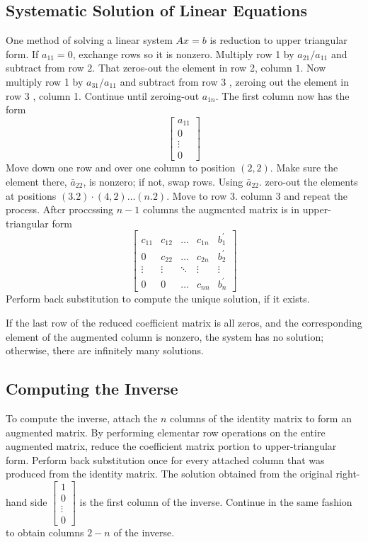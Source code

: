 \documentclass[../main.tex]{subfiles}
\begin{document}
\subsection*{Systematic Solution of Linear Equations}
One method of solving a linear system $A x=b$ is reduction to upper triangular form. If $a_{11}=0$, exchange rows so it is nonzero. Multiply row 1 by $a_{21} / a_{11}$ and subtract from row $2 .$ That zeros-out the element in row 2, column $1 .$ Now multiply row 1 by $a_{31} / a_{11}$ and subtract from row 3 , zeroing out the element in row 3 , column 1. Continue until zeroing-out $a_{1 n}$. The first column now has the form
$$
\left[\begin{array}{c}
a_{11} \\
0 \\
\vdots \\
0
\end{array}\right]
$$
Move down one row and over one column to position $(2,2) .$ Make sure the element there, $\bar{a}_{22}$, is nonzero; if not, swap rows. Using $\bar{a}_{22}$. zero-out the elements at positions $(3.2) \cdot(4,2) \ldots(n .2)$. Move to row 3. column 3 and repeat the process. Aftcr proccssing $n-1$ columns the augmcntcd matrix is in upper-triangular form
$$
\left[\begin{array}{cccc|c}
c_{11} & c_{12} & \ldots & c_{1 n} & b_{1}^{\prime} \\
0 & c_{22} & \ldots & c_{2 n} & b_{2}^{\prime} \\
\vdots & \vdots & \ddots & \vdots & \vdots \\
0 & 0 & \ldots & c_{n n} & b_{n}^{\prime}
\end{array}\right]
$$
Perform back substitution to compute the unique solution, if it exists.

If the last row of the reduced coefficient matrix is all zeros, and the corresponding element of the augmented column is nonzero, the system has no solution; otherwise, there are infinitely many solutions.

\subsection*{Computing the Inverse}
To compute the inverse, attach the $n$ columns of the identity matrix to form an augmented matrix. By performing elementar row operations on the entire augmented matrix, reduce the coefficient matrix portion to upper-triangular form. Perform back substitution once for every attached column that was produced from the identity matrix. The solution obtained from the original right-hand side
$
\left[\begin{array}{c}
1\\ 0 \\ \vdots \\ 0
\end{array}\right]
$
is the first column of the inverse. Continue in the same fashion to obtain columns $2 - n$ of the inverse.
\end{document}
